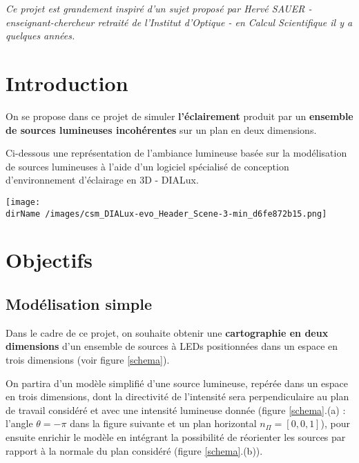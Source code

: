 
\textit{Ce projet est grandement inspiré d'un sujet proposé par \textit{Hervé SAUER} - enseignant-chercheur retraité de l'Institut d'Optique - en Calcul Scientifique il y a quelques années.}

\section{Introduction}

On se propose dans ce projet de simuler \textbf{l'éclairement} produit par un \textbf{ensemble de sources lumineuses incohérentes} sur un plan en deux dimensions.

\medskip

Ci-dessous une représentation de l'ambiance lumineuse basée sur la modélisation de sources lumineuses à l'aide d'un logiciel spécialisé de conception d'environnement d'éclairage en 3D - DIALux.

\begin{center}
	\texttt{[image:  \\dirName /images/csm\_DIALux-evo\_Header\_Scene-3-min\_d6fe872b15.png]}
\end{center}


\section{Objectifs}

\subsection{Modélisation simple}

Dans le cadre de ce projet, on souhaite obtenir une \textbf{cartographie en deux dimensions} d'un ensemble de sources à LEDs positionnées dans un espace en trois dimensions (voir figure \ref{schema}).

On partira d'un modèle simplifié d'une source lumineuse, repérée dans un espace en trois dimensions, dont la directivité de l'intensité sera perpendiculaire au plan de travail considéré et avec une intensité lumineuse donnée (figure \ref{schema}.(a) : l'angle $\theta = -\pi$ dans la figure suivante et un plan horizontal $n_\Pi = [0, 0, 1]$), pour ensuite enrichir le modèle en intégrant la possibilité de réorienter les sources par rapport à la normale du plan considéré (figure \ref{schema}.(b)).

